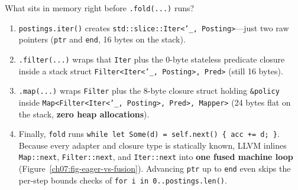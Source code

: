 What sits in memory right before \texttt{.fold(...)} runs?
\begin{enumerate}
  \item \texttt{postings.iter()} creates \texttt{std::slice::Iter<'\_, Posting>}---just
    two raw pointers (\texttt{ptr} and \texttt{end}, 16 bytes on the stack).
  \item \texttt{.filter(...)} wraps that \texttt{Iter} plus the 0-byte stateless
    predicate closure inside a stack struct \texttt{Filter<Iter<'\_, Posting>, Pred>}
    (still 16 bytes).
  \item \texttt{.map(...)} wraps \texttt{Filter} plus the 8-byte closure struct holding
    \texttt{\&policy} inside \texttt{Map<Filter<\allowbreak{}Iter<'\_, Posting>, Pred>, Mapper>}
    (24 bytes flat on the stack, \textbf{zero heap allocations}).
  \item \begin{sloppypar}Finally, \texttt{fold} runs \texttt{while let Some(d) = self.next() \{ acc += d; \}}. Because every adapter and closure type is statically known, LLVM inlines \texttt{Map::next}, \texttt{Filter::next}, and \texttt{Iter::next} into \textbf{one fused machine loop} (Figure~\ref{ch07:fig-eager-vs-fusion}). Advancing \texttt{ptr} up to \texttt{end} even skips the per-step bounds checks of \texttt{for i in 0..postings.len()}.\end{sloppypar}
\end{enumerate}

